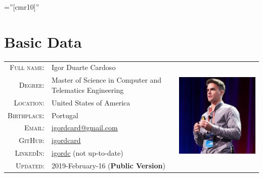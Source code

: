 \documentclass[letter,10pt]{article} %
\begin{document}
\pagestyle{empty} %

\font\fb=''[cmr10]'' %



\par{\bigskip\par} %

\section{Basic Data}

\begin{tabular}{rlr}
\textsc{Full name:} & Igor Duarte Cardoso & \multirow{9}{*}{\includegraphics[scale=0.5]{avatar.jpg}} \\
\textsc{Degree:} & Master of Science in Computer and Telematics Engineering & \\
\textsc{Location:} & United States of America & \\
\textsc{Birthplace:} & {Portugal} & \\
\textsc{Email:} & \href{mailto:igordcard+cv@gmail.com}{igordcard@gmail.com} & \\
\textsc{GitHub:} & \href{https://github.com/igordcard}{igordcard} & \\
\textsc{LinkedIn:} & \href{https://linkedin.com/in/igordc}{igordc} (not up-to-date) & \\
\textsc{Updated:} & 2019-February-16 (\textbf{Public Version}) & \\
\end{tabular} \\
\end{document}
